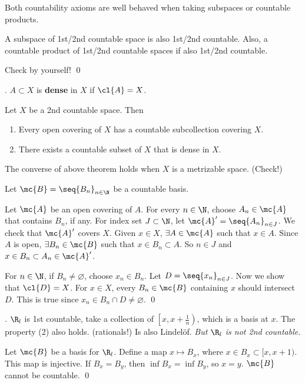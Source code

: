 Both countability axioms are well behaved when taking subspaces or countable products.

 A subspace of 1st/2nd countable space is also 1st/2nd countable. Also, a countable product of 1st/2nd countable spaces if also 1st/2nd countable.

\pf Check by yourself! \qed

\medskip

.  \(A \subset X\) is \textbf{dense} in \(X\) if \(\cl{A} = X\).

 Let \(X\) be a 2nd countable space. Then
\begin{enumerate}
    \item {} Every open covering of \(X\) has a countable subcollection covering \(X\).
    \item There exists a countable subset of \(X\) that is dense in \(X\).
\end{enumerate}

\rmk The converse of above theorem holds when \(X\) is a metrizable space. (Check!)

\pf Let \(\mc{B} = \seq{B_n}_{n\in \N}\) be a countable basis.

 Let \(\mc{A}\) be an open covering of \(A\). For every \(n \in \N\), choose \(A_n \in \mc{A}\) that contains \(B_n\), if any. For index set \(J \subset \N\), let \(\mc{A}' = \seq{A_n}_{n \in J}\). We check that \(\mc{A}'\) covers \(X\). Given \(x \in X\), \(\exists A \in \mc{A}\) such that \(x \in A\). Since \(A\) is open, \(\exists B_n \in \mc{B}\) such that \(x \in B_n \subset A\). So \(n \in J\) and \(x \in B_n \subset A_n \in \mc{A}'\).

 For \(n \in \N\), if \(B_n \neq \varnothing\), choose \(x_n \in B_n\). Let \(D = \seq{x_n}_{n \in J}\). Now we show that \(\cl{D} = X\). For \(x \in X\), every \(B_n \in \mc{B}\) containing \(x\) should intersect \(D\). This is true since \(x_n \in B_n \cap D \neq \varnothing\). \qed

\ex. \(\R_l\) is 1st countable, take a collection of \(\left[x, x + \frac{1}{n}\right)\), which is a basis at \(x\). The property (2) also holds. (rationals!) Is also Lindelöf. \textit{But \(\R_l\) is not 2nd countable.}

\pf Let \(\mc{B}\) be a basis for \(\R_l\). Define a map \(x \mapsto B_x\), where \(x \in B_x \subset [x, x+1)\). This map is injective. If \(B_x = B_y\), then \(\inf B_x = \inf B_y\), so \(x = y\). \(\mc{B}\) cannot be countable. \qed

